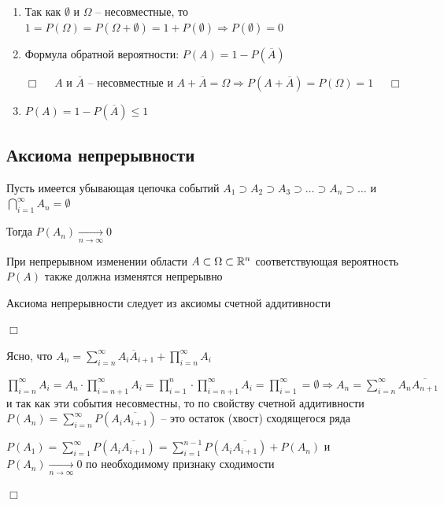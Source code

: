 \documentclass[12pt]{article}
\begin{document}
    \hypertarget{probabilityproperties}{}

    \begin{enumerate}

        \item Так как $\emptyset$ и $\Omega$ -- несовместные, то $1 = P(\Omega) = P(\Omega + \emptyset) = 1 + P(\emptyset) \Longrightarrow P(\emptyset) = 0$

        \item Формула обратной вероятности: $P(A) = 1 - P(\overline{A})$

        \begin{tcolorbox}
            $\Box \quad$ $A$ и $\overline{A}$ -- несовместные и $A + \overline{A} = \Omega \Longrightarrow P(A + \overline{A}) = P(\Omega) = 1$ $\quad \Box$
        \end{tcolorbox}

        \item $P(A) = 1 - P(\overline{A}) \leq 1$

    \end{enumerate}

    \hypertarget{continuityaxiom}{}

    \subsection{Аксиома непрерывности}

    \begin{MyTheorem}
        \Ths Пусть имеется убывающая цепочка событий $A_1 \supset A_2 \supset A_3 \supset \dots \supset A_n \supset \dots$ и $\bigcap_{i = 1}^\infty A_n = \emptyset$

        Тогда $P(A_n) \underset{n \to \infty}{\to} 0$

        При непрерывном изменении области $A \subset \Omega \subset \mathbb{R}^n$ соответствующая вероятность $P(A)$ также должна изменятся непрерывно
    \end{MyTheorem}

    Аксиома непрерывности следует из аксиомы счетной аддитивности

    \begin{tcolorbox}
        $\Box$

        Ясно, что $A_n = \sum_{i = n}^\infty A_i \overline{A}_{i + 1} + \prod_{i = n}^\infty A_i$

        $\prod_{i = n}^\infty A_i = A_n \cdot \prod_{i = n + 1}^\infty A_i = \prod_{i = 1}^n
        \cdot \prod_{i = n + 1}^\infty A_i = \prod_{i = 1}^\infty = \emptyset \Longrightarrow
        A_n = \sum_{i = n}^\infty A_n \overline{A_{n + 1}}$ и так как эти события несовместны,
        то по свойству счетной аддитивности $P(A_n) = \sum_{i = n}^\infty P(A_i \overline{A_{i + 1}})$ -- это остаток (хвост) сходящегося ряда

        $P(A_1) = \sum_{i = 1}^\infty P(A_i \overline{A_{i + 1}}) = \sum_{i = 1}^{n - 1} P(A_i \overline{A_{i + 1}}) + P(A_n)$ и $P(A_n) \underset{n \to \infty}{\to} 0$ по необходимому признаку сходимости

        $\Box$
    \end{tcolorbox}
\end{document}
